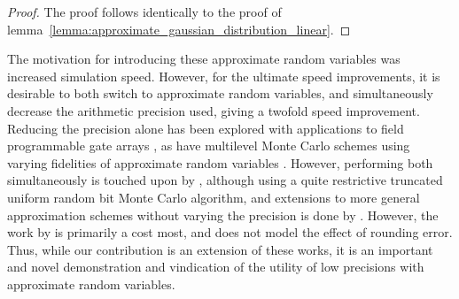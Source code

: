 \documentclass[9pt,a4paper,english]{extarticle}
\begin{document}
\begin{proof}
The proof follows identically to the proof of lemma~\ref{lemma:approximate_gaussian_distribution_linear}. \qedhere
\end{proof}

The motivation for introducing these approximate random variables was increased simulation speed. However, for the ultimate speed improvements, it is desirable to both switch to approximate random variables, and simultaneously decrease the arithmetic precision used, giving a twofold speed improvement. Reducing the precision alone has been explored with applications to field programmable gate arrays  \citep{brugger2014mixed,omland2015exploiting,omland2016mixed,chow2012mixed}, as have multilevel Monte Carlo schemes using varying fidelities of approximate random variables \citep{muller1958inverse}. However, performing both simultaneously is touched upon by \citet{giles2019random_multilevel}, although using a quite restrictive truncated uniform random bit Monte Carlo algorithm, and extensions to more general approximation schemes without varying the precision is done by \citet{giles2020approximate}. However, the work by \citet{giles2019random_multilevel} is primarily a cost most, and does not model the effect of rounding error. Thus, while our contribution is an extension of these works, it is an important and novel demonstration and vindication of the utility of low precisions with approximate random variables. 
\end{document}
